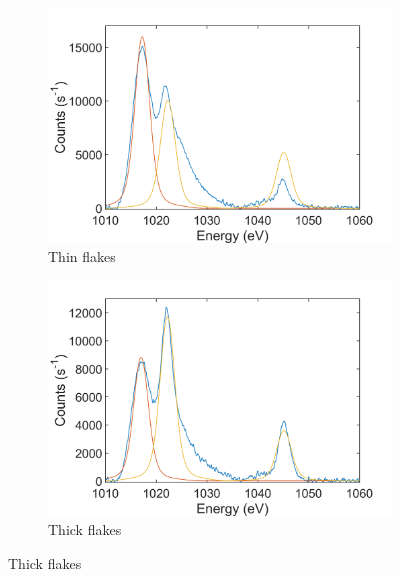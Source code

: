 \begin{figure}[!h]
	\begin{center}
		\begin{subfigure}[b]{0.4\textwidth}
			\includegraphics[scale=0.2]{WSe2/WSe2XPSThinZn.png}
			\caption{Thin flakes}
			\label{fig:WSe2XPSThinZn}
		\end{subfigure}
		\qquad
		\begin{subfigure}[b]{0.4\textwidth}
			\includegraphics[scale=0.2]{WSe2/WSe2XPSThickZn.png}
			\caption{Thick flakes}
			\label{fig:WSe2XPSThickZn}
		\end{subfigure}
		

\end{center}
\end{figure}
